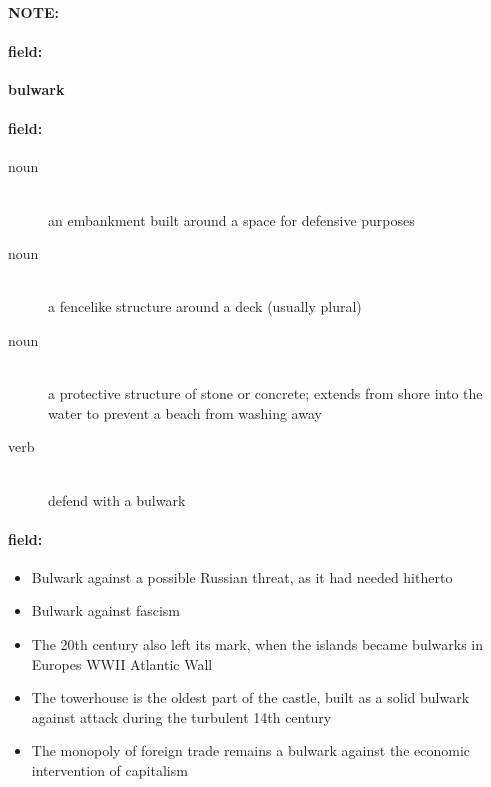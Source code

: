 \documentclass[12pt]{article}
\newenvironment{note}{\paragraph{NOTE:}}{}
\newenvironment{field}{\paragraph{field:}}{}
\begin{document}
\begin{note}
\begin{field}
\textbf{\large bulwark}
\end{field}


\begin{field}
\begin{description}
\item[noun] \hfill \\ 
an embankment built around a space for defensive purposes

\item[noun] \hfill \\ 
a fencelike structure around a deck (usually plural)

\item[noun] \hfill \\ 
a protective structure of stone or concrete; extends from shore into the water to prevent a beach from washing away

\item[verb] \hfill \\ 
defend with a bulwark

\end{description}
\end{field}

\begin{field}
\begin{itemize}
\item Bulwark against a possible Russian threat, as it had needed hitherto
\item Bulwark against fascism
\item The 20th century also left its mark, when the islands became bulwarks in Europes WWII Atlantic Wall
\item The towerhouse is the oldest part of the castle, built as a solid bulwark against attack during the turbulent 14th century
\item The monopoly of foreign trade remains a bulwark against the economic intervention of capitalism
\end{itemize}
\end{field}
\end{note}
\end{document}
